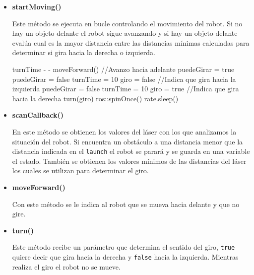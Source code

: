 \documentclass[11pt]{article}
\begin{document}
\begin{itemize}
\item \textbf{startMoving()}

Este método se ejecuta en bucle controlando el movimiento del robot. Si no hay un objeto delante el robot sigue avanzando y si hay un objeto delante evalúa cual es la mayor distancia entre las distancias mínimas calculadas para determinar si gira hacia la derecha o izquierda.\\

\begin{algorithmic}
    	\State turnTime \-- \--
	\Else
        	\State moveForward() //Avanzo hacia adelante
        	\State puedeGirar = true
        \Else
        		\State puedeGirar = false
        		\State turnTime = 10
        		\State giro = false //Indica que gira hacia la izquierda
        		\State puedeGirar = false
        		\State turnTime = 10
        		\State giro = true //Indica que gira hacia la derecha
        	\EndIf
        	\State turn(giro)
		\EndIf
	\EndIf
	\State ros::spinOnce()
    \State rate.sleep()
\EndWhile
\end{algorithmic}

\item \textbf{scanCallback()}

En este método se obtienen los valores del láser con los que analizamos la situación del robot. Si encuentra un obstáculo a una distancia menor que la distancia indicada en el \texttt{launch} el robot se parará y se guarda en una variable el estado. También se obtienen los valores mínimos de las distancias del láser los cuales se utilizan para determinar el giro.

\item \textbf{moveForward()}

Con este método se le indica al robot que se mueva hacia delante y que no gire.

\item \textbf{turn()}

Este método recibe un parámetro que determina el sentido del giro, \texttt{true} quiere decir que gira hacia la derecha y \texttt{false} hacia la izquierda. Mientras realiza el giro el robot no se mueve.



\end{itemize}
\end{document}
